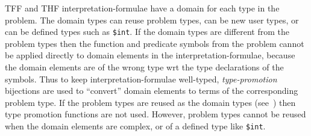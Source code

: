 \documentclass{easychair}
\begin{document}
TFF and THF interpretation-formulae have a domain for each type in the problem.
The domain types can reuse problem types, can be new user types, or can be defined types
such as {\tt \$int}.
If the domain types are different from the problem types then the function and predicate symbols 
from the problem cannot be applied directly to domain elements in the interpretation-formulae, 
because the domain elements are of the wrong type wrt the type declarations of the symbols.
Thus to keep interpretation-formulae well-typed, \emph{type-promotion} bijections are used to 
``convert'' domain elements to terms of the corresponding problem type.
If the problem types are reused as the domain types (see~\cite[\S5.3.4]{Gal15}) then type
promotion functions are not used.
However, problem types cannot be reused when the domain elements are complex, or of a defined 
type like {\tt \$int}.
\end{document}
